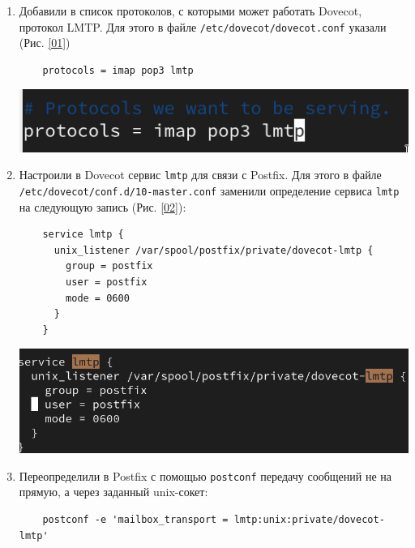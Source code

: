 \begin{enumerate}
\item Добавили в список протоколов, с которыми может работать Dovecot, протокол LMTP. Для этого в файле \texttt{/etc/dovecot/dovecot.conf} указали (Рис. \ref{01})
  \begin{verbatim}
    protocols = imap pop3 lmtp
  \end{verbatim}
\begin{center}
    \centering
    \includegraphics[width=\textwidth]{../images/image01.png}
    \label{01}
\end{center}
\item Настроили в Dovecot сервис \texttt{lmtp} для связи с Postfix. Для этого в файле \break \texttt{/etc/dovecot/conf.d/10-master.conf} заменили определение сервиса \texttt{lmtp} на следующую запись (Рис. \ref{02}):
  \begin{verbatim}
    service lmtp {
      unix_listener /var/spool/postfix/private/dovecot-lmtp {
        group = postfix
        user = postfix
        mode = 0600
      }
    }
  \end{verbatim}
\begin{center}
    \centering
    \includegraphics[width=\textwidth]{../images/image02.png}
    \label{02}
\end{center}
\item Переопределили в Postfix с помощью \texttt{postconf} передачу сообщений не на прямую, а через заданный unix-сокет:
  \begin{verbatim}
    postconf -e 'mailbox_transport = lmtp:unix:private/dovecot-lmtp'
  \end{verbatim}

\end{enumerate}
